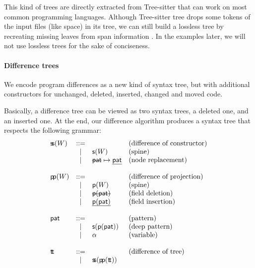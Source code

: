 \documentclass[a4paper,11pt]{article}
\newcommand\del[1]{\text{\st{$#1$}}}
\newcommand\ins[1]{\text{\ul{$#1$}}}
\begin{document}

This kind of trees are directly extracted from Tree-sitter  that can work on
most common programming languages. Although Tree-sitter tree drops some tokens
of the input files (like space) in its tree, we can still build a lossless tree
by recreating missing leaves from span information .
In the examples later, we will not use lossless trees for the sake of
conciseness.

\paragraph{Difference trees}
We encode program differences as a new kind of syntax tree, but with additional
constructors for unchanged, deleted, inserted, changed and moved code.

\newcommand{\aSpineSum}{\ensuremath{\aSum\!\aSum}}
\newcommand{\aSpineProd}{\ensuremath{\aProd\!\aProd}}
\newcommand{\aDiffTree}{\ensuremath{\aTree\!\aTree}}
\newcommand{\aPatternTree}{\ensuremath{\mathsf{pat}}}
\newcommand{\aVar}{\ensuremath{\alpha}}
\newcommand{\defCopy}{\ensuremath{\square}}
\newcommand{\defIdent}[2]{\defNode{#1}{#2}}
\newcommand{\defReplace}[2]{\del{#1} \mapsto \ins{#2}}

Basically, a difference tree can be viewed as two syntax trees, a deleted one, and
an
inserted one.
At the end, our difference algorithm produces a syntax tree that respects the
following grammar:
%
\[\begin{array}{lcll}
\aSpineSum(W) & ::= & & \text{(difference of constructor)} \\
        & |   & \aSum(W) & \text{(spine)} \\
        & |   & \defReplace \aPatternTree \aPatternTree & \text{(node replacement)} \\
\\
\aSpineProd(W) & ::= & & \text{(difference of projection)} \\
                 & |   & \aProd(W) & \text{(spine)} \\
                 & |   & \del{\aProd(\aPatternTree)} & \text{(field deletion)} \\
                 & |   & \ins{\aProd(\aPatternTree)} & \text{(field insertion)} \\
\\
\aPatternTree & ::= & & \text{(pattern)} \\
        & |   & \aSum(\aProd(\aPatternTree)) & \text{(deep pattern)}\\
        & |   & \aVar & \text{(variable)} \\
\\
\aDiffTree & ::= & & \text{(difference of tree)} \\
           & |   & \aSpineSum(\aSpineProd(\aDiffTree))
\end{array}\]
\end{document}
